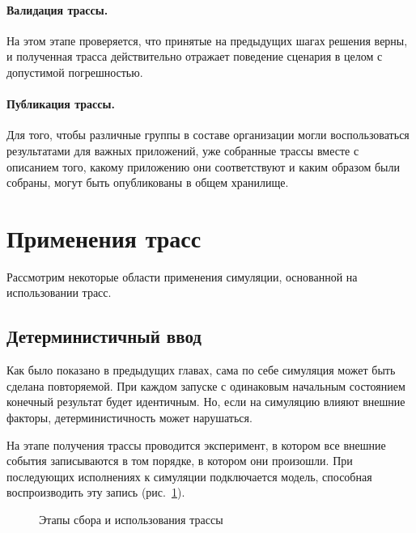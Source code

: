 \paragraph{Валидация трассы.} На этом этапе проверяется, что принятые на предыдущих шагах решения верны, и полученная трасса действительно отражает поведение сценария в целом с допустимой погрешностью.

\paragraph{Публикация трассы.} Для того, чтобы различные группы в составе организации могли воспользоваться результатами для важных приложений, уже собранные трассы вместе с описанием того, какому приложению они соответствуют и каким образом были собраны, могут быть опубликованы в общем хранилище.

\section{Применения трасс}

Рассмотрим некоторые области применения симуляции, основанной на использовании трасс.

\subsection{Детерминистичный ввод}

Как было показано в предыдущих главах, сама по себе симуляция может быть сделана повторяемой. При каждом запуске с одинаковым начальным состоянием конечный результат будет идентичным. Но, если на симуляцию влияют внешние факторы, детерминистичность может нарушаться.

На этапе получения трассы проводится эксперимент, в котором все внешние события записываются в том порядке, в котором они произошли. При последующих исполнениях к симуляции подключается модель, способная воспроизводить эту запись (рис.~\ref{fig:trace-collection}).

\begin{figure}[htp]
    \centering
    \caption[Этапы сбора и использования трассы]{Этапы сбора и использования трассы}
    \label{fig:trace-collection}
\end{figure}


